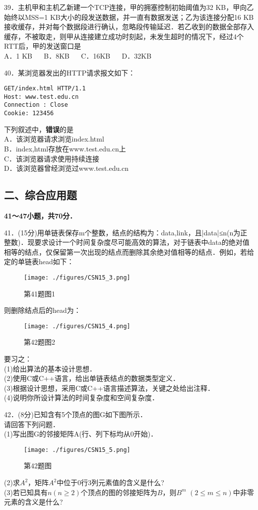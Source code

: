 39．主机甲和主机乙新建一个TCP连接，甲的拥塞控制初始阈值为32 KB，甲向乙始终以MSS=1 KB大小的段发送数据，并一直有数据发送；乙为该连接分配16 KB接收缓存，并对每个数据段进行确认，忽略段传输延迟．若乙收到的数据全部存入缓存，不被取走，则甲从连接建立成功时刻起，未发生超时的情况下，经过4个RTT后，甲的发送窗口是 \\
A．1 KB $\quad$ B．8KB $\quad$ C．16KB $\quad$ D．32KB

40．某浏览器发出的HTTP请求报文如下： \\
\begin{lstlisting}
GET/index.html HTTP/1.1
Host: www.test.edu.cn
Connection : Close
Cookie: 123456
\end{lstlisting}
下列叙述中，\textbf{错误}的是 \\
A．该浏览器请求浏览index.html \\
B．index,html存放在www.test.edu.cn上 \\
C．该浏览器请求使用持续连接 \\
D．该浏览器曾经浏览过www.test.edu.cn

\subsection{二、综合应用题}
\textbf{41～47小题，共70分．}

41．(15分)用单链表保存m个整数，结点的结构为：data,link，且|data|≤n(n为正整数)．现要求设计一个时间复杂度尽可能高效的算法，对于链表中data的绝对值相等的结点，仅保留第一次出现的结点而删除其余绝对值相等的结点．例如，若给定的单链表head如下：
\begin{figure}[ht]
\centering
\texttt{[image: ./figures/CSN15\_3.png]}
\caption{第41题图1} \label{CSN15_fig3}
\end{figure}
则删除结点后的head为：
\begin{figure}[ht]
\centering
\texttt{[image: ./figures/CSN15\_4.png]}
\caption{第42题图2} \label{CSN15_fig4}
\end{figure}
要习之： \\
(1)给出算法的基本设计思想． \\
(2)使用C或C++语言，给出单链表结点的数据类型定义． \\
(3)根据设计思想，采用C或C++语言描述算法，关键之处给出注释． \\
(4)说明你所设计算法的时间复杂度和空间复杂度．

42．(8分)已知含有5个顶点的图G如下图所示． \\
请回答下列问题． \\
(1)写出图G的邻接矩阵A(行、列下标均从0开始)．
\begin{figure}[ht]
\centering
\texttt{[image: ./figures/CSN15\_5.png]}
\caption{第42题图} \label{CSN15_fig5}
\end{figure}
(2)求$A^2$，矩阵$A^2$中位于$0$行$3$列元素值的含义是什么? \\
(3)若已知具有$n(n\geqslant2)$个顶点的图的邻接矩阵为$B$，则$B^m$ $(2\leqslant m\leqslant n)$中非零元素的含义是什么?

